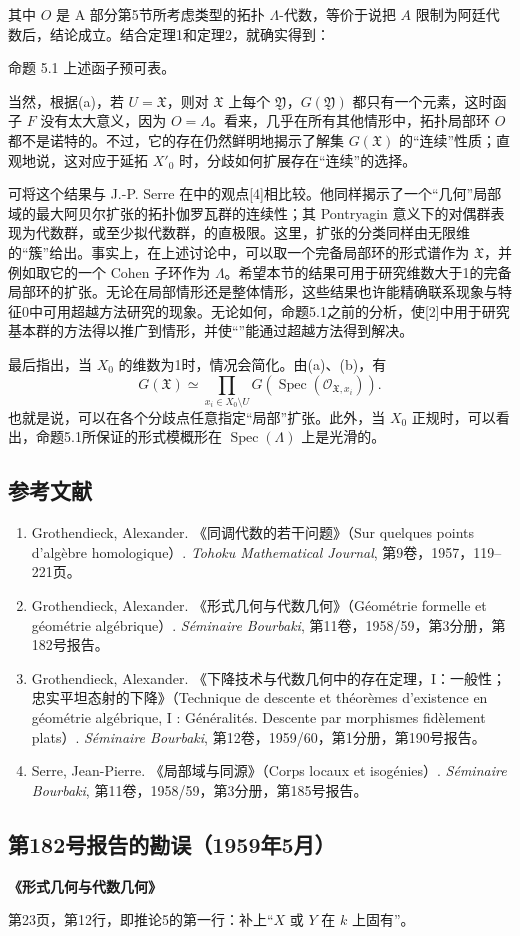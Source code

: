 其中 $O$ 是 A 部分第5节所考虑类型的拓扑 $\Lambda$-代数，等价于说把 $A$ 限制为阿廷代数后，结论成立。结合定理1和定理2，就确实得到：
\begin{statement}{命题 5.1}
上述函子预可表。
\end{statement}
当然，根据(a)，若 $U=\mathfrak X$，则对 $\mathfrak X$ 上每个 $\mathfrak Y$，$G(\mathfrak Y)$ 都只有一个元素，这时函子 $F$ 没有太大意义，因为 $O=\Lambda$。看来，几乎在所有其他情形中，拓扑局部环 $O$ 都不是诺特的。不过，它的存在仍然鲜明地揭示了解集 $G(\mathfrak X)$ 的“连续”性质；直观地说，这对应于延拓 $X'_0$ 时，分歧如何扩展存在“连续”的选择。

可将这个结果与 J.-P. Serre 在中的观点[4]相比较。他同样揭示了一个“几何”局部域的最大阿贝尔扩张的拓扑伽罗瓦群的连续性；其 Pontryagin 意义下的对偶群表现为代数群，或至少拟代数群，的直极限。这里，扩张的分类同样由无限维的“簇”给出。事实上，在上述讨论中，可以取一个完备局部环的形式谱作为 $\mathfrak X$，并例如取它的一个 Cohen 子环作为 $\Lambda$。希望本节的结果可用于研究维数大于1的完备局部环的扩张。无论在局部情形还是整体情形，这些结果也许能精确联系现象与特征0中可用超越方法研究的现象。无论如何，命题5.1之前的分析，使[2]中用于研究基本群的方法得以推广到情形，并使“”能通过超越方法得到解决。

最后指出，当 $X_0$ 的维数为1时，情况会简化。由(a)、(b)，有
\[
 G(\mathfrak X)\simeq
 \prod_{x_i\in X_0\setminus U}
 G(\operatorname{Spec}(\mathcal O_{\mathfrak X,x_i})).
\]
也就是说，可以在各个分歧点任意指定“局部”扩张。此外，当 $X_0$ 正规时，可以看出，命题5.1所保证的形式模概形在 $\operatorname{Spec}(\Lambda)$ 上是光滑的。

\subsection*{参考文献}
\begin{enumerate}
\item[{[1]}] Grothendieck, Alexander. 《同调代数的若干问题》（Sur quelques points d'algèbre homologique）. \textit{Tohoku Mathematical Journal}, 第9卷，1957，119--221页。
\item[{[2]}] Grothendieck, Alexander. 《形式几何与代数几何》（Géométrie formelle et géométrie algébrique）. \textit{Séminaire Bourbaki}, 第11卷，1958/59，第3分册，第182号报告。
\item[{[3]}] Grothendieck, Alexander. 《下降技术与代数几何中的存在定理，I：一般性；忠实平坦态射的下降》（Technique de descente et théorèmes d'existence en géométrie algébrique, I : Généralités. Descente par morphismes fidèlement plats）. \textit{Séminaire Bourbaki}, 第12卷，1959/60，第1分册，第190号报告。
\item[{[4]}] Serre, Jean-Pierre. 《局部域与同源》（Corps locaux et isogénies）. \textit{Séminaire Bourbaki}, 第11卷，1958/59，第3分册，第185号报告。
\end{enumerate}
\subsection*{第182号报告的勘误（1959年5月）}
\noindent\textbf{《形式几何与代数几何》}

第23页，第12行，即推论5的第一行：补上“$X$ 或 $Y$ 在 $k$ 上固有”。
